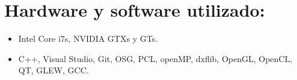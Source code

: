 %
%

\section*{Hardware y software utilizado:}

\begin{itemize}
\item Intel Core i7s, NVIDIA GTXs y GTs.
\item C++, Visual Studio, Git, OSG, PCL, openMP, dxflib, OpenGL, OpenCL, QT, GLEW, GCC.
\end{itemize}


